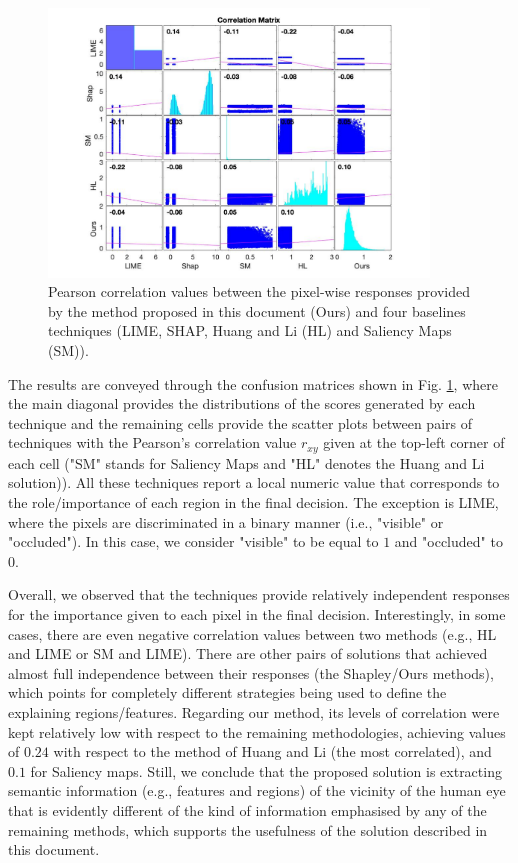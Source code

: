 \begin{figure}[h]
  \begin{center}
  \includegraphics[width=0.9\textwidth]{figures/figure_38.pdf}
  \caption{Pearson  correlation  values  between  the  pixel-wise  responses provided by the method proposed in this document (Ours) and four baselines techniques (\ac{LIME}, \ac{SHAP}, Huang and Li (HL) and Saliency Maps (SM)).}
  \label{fig:confusion_matrices}
  \end{center}
\end{figure}

The results are conveyed through the confusion matrices shown in Fig. \ref{fig:confusion_matrices}, where the main diagonal provides the distributions of the scores generated by each technique and the remaining cells provide the scatter plots between pairs of techniques with the Pearson's correlation value $r_{xy}$ given at the top-left corner of each cell ("SM" stands for Saliency Maps and "HL" denotes the Huang and Li solution)). All these techniques report a local numeric value that corresponds to the role/importance of each region in the final decision. The exception is \ac{LIME}, where the pixels are discriminated in a binary manner (i.e., "visible" or "occluded"). In this case, we consider "visible" to be equal to $1$ and "occluded" to $0$.

Overall, we observed that the techniques provide relatively independent responses for the importance given to each pixel in the final decision. Interestingly, in some cases, there are even negative correlation values between two methods (e.g., HL and \ac{LIME} or SM and \ac{LIME}). There are other pairs of solutions that achieved almost full independence between their responses (the Shapley/Ours methods), which points for completely different strategies being used to define the explaining regions/features. Regarding our method, its levels of correlation were kept relatively low with respect to the remaining methodologies, achieving values of  $0.24$ with respect to the method of Huang and Li (the most correlated), and $0.1$ for Saliency maps. Still, we conclude that the proposed solution is extracting  semantic information (e.g., features and regions) of the vicinity of the human eye that is evidently different of the kind of information emphasised  by any of the remaining methods, which supports the usefulness of the solution described in this document.

